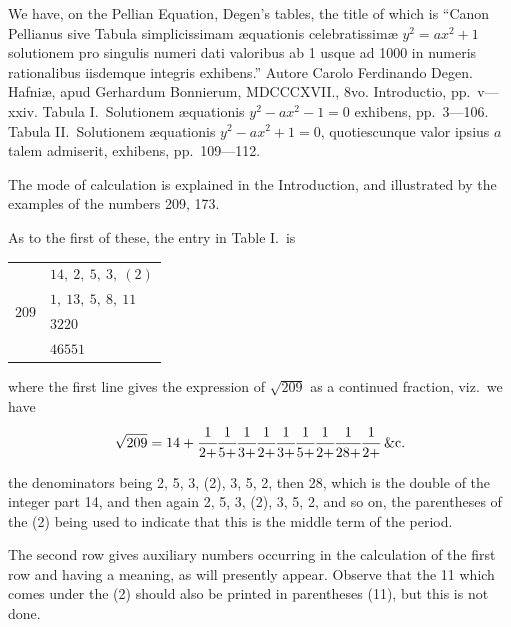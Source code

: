 \documentclass[11pt]{article}
\begin{document}
\noindent We have, on the Pellian Equation, Degen's tables, the title of which is ``Canon Pellianus sive Tabula simplicissimam {\ae}quationis celebratissim{\ae} $y^2 = ax^2 + 1$ solutionem pro singulis numeri dati valoribus ab 1 usque ad 1000 in numeris rationalibus iisdemque integris exhibens.'' Autore Carolo Ferdinando Degen. Hafni{\ae}, apud Gerhardum Bonnierum, MDCCCXVII., 8vo. Introductio, pp.\ v---xxiv. Tabula I.\ Solutionem {\ae}quationis $y^2 - ax^2 - 1 = 0$ exhibens, pp.\ 3---106. Tabula II.\ Solutionem {\ae}quationis $y^2 - ax^2 + 1 = 0$, quotiescunque valor ipsius $a$ talem admiserit, exhibens, pp.\ 109---112.

The mode of calculation is explained in the Introduction, and illustrated by the examples of the numbers 209, 173.

As to the first of these, the entry in Table I.\ is
\begin{center}
\begin{tabular}{c|l}
\multirow{4}{*}{$209$} & $14,\ 2,\ 5,\ 3,\ (2)$ \\
 & $1,\ 13,\ 5,\ 8,\ 11$ \\
 & $3220$ \\
 & $46551$ \\
\end{tabular}
\end{center}
where the first line gives the expression of $\sqrt{209}$ as a continued fraction, viz.\ we have
\[
\sqrt{209} = 14 + \cfrac{1}{2 +} \cfrac{1}{5 +} \cfrac{1}{3 +} \cfrac{1}{2 +} \cfrac{1}{3 +} \cfrac{1}{5 +} \cfrac{1}{2 +} \cfrac{1}{28 +} \cfrac{1}{2 +}\;\&\text{c.}
\]

the denominators being 2, 5, 3, (2), 3, 5, 2, then 28, which is the double of the integer part 14, and then again 2, 5, 3, (2), 3, 5, 2, and so on, the parentheses of the (2) being used to indicate that this is the middle term of the period.

The second row gives auxiliary numbers occurring in the calculation of the first row and having a meaning, as will presently appear. Observe that the 11 which comes under the (2) should also be printed in parentheses (11), but this is not done.
\end{document}
